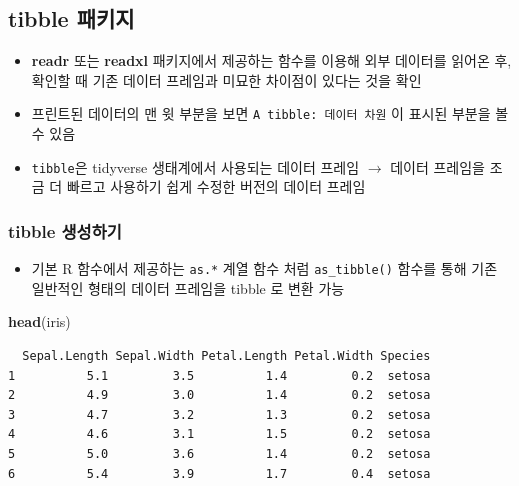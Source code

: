 \documentclass[
  11pt,
]{krantz}
\newenvironment{Shaded}{\begin{snugshade}}{\end{snugshade}}
\newcommand{\KeywordTok}[1]{\textcolor[rgb]{0.27,0.27,0.27}{\textbf{#1}}}
\newcommand{\NormalTok}[1]{#1}
\providecommand{\tightlist}{%
  \setlength{\itemsep}{0pt}\setlength{\parskip}{0pt}}
\begin{document}
\normalsize

\hypertarget{tibble}{%
\subsection{tibble 패키지}\label{tibble}}

\begin{itemize}
\tightlist
\item
  \textbf{readr} 또는 \textbf{readxl} 패키지에서 제공하는 함수를 이용해 외부 데이터를 읽어온 후, 확인할 때 기존 데이터 프레임과 미묘한 차이점이 있다는 것을 확인
\item
  프린트된 데이터의 맨 윗 부분을 보면 \texttt{A\ tibble:\ 데이터\ 차원} 이 표시된 부분을 볼 수 있음
\item
  \texttt{tibble}은 tidyverse 생태계에서 사용되는 데이터 프레임 \(\rightarrow\) 데이터 프레임을 조금 더 빠르고 사용하기 쉽게 수정한 버전의 데이터 프레임
\end{itemize}

\hypertarget{create-tibble}{%
\subsubsection*{tibble 생성하기}\label{create-tibble}}


\begin{itemize}
\tightlist
\item
  기본 R 함수에서 제공하는 \texttt{as.*} 계열 함수 처럼 \texttt{as\_tibble()} 함수를 통해 기존 일반적인 형태의 데이터 프레임을 tibble 로 변환 가능
\end{itemize}

\footnotesize

\begin{Shaded}
\begin{Highlighting}[]
\KeywordTok{head}\NormalTok{(iris)}
\end{Highlighting}
\end{Shaded}

\begin{verbatim}
  Sepal.Length Sepal.Width Petal.Length Petal.Width Species
1          5.1         3.5          1.4         0.2  setosa
2          4.9         3.0          1.4         0.2  setosa
3          4.7         3.2          1.3         0.2  setosa
4          4.6         3.1          1.5         0.2  setosa
5          5.0         3.6          1.4         0.2  setosa
6          5.4         3.9          1.7         0.4  setosa
\end{verbatim}
\end{document}
